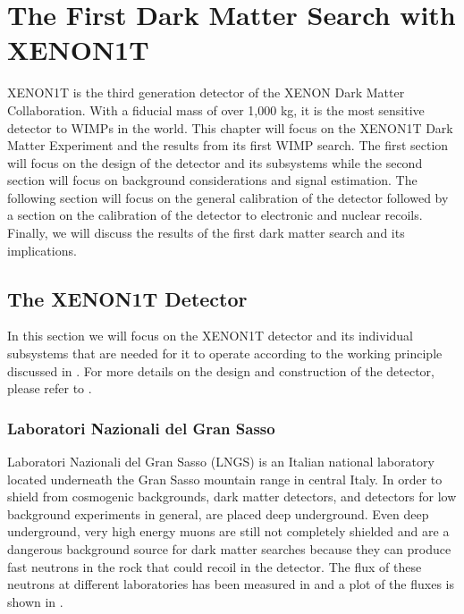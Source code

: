 

\pagestyle{cu}
\graphicspath{{./Chapter3/images/}}

\chapter[The First Dark Matter Search with XENON1T][The First Dark Matter Search with XENON1T]{The First Dark Matter Search with XENON1T}

XENON1T is the third generation detector of the XENON Dark Matter Collaboration.  With a fiducial mass of over 1,000 kg, it is the most sensitive detector to WIMPs in the world.  This chapter will focus on the XENON1T Dark Matter Experiment and the results from its first WIMP search.  The first section will focus on the design of the detector and its subsystems while the second section will focus on background considerations and signal estimation.  The following section will focus on the general calibration of the detector followed by a section on the calibration of the detector to electronic and nuclear recoils.  Finally, we will discuss the results of the first dark matter search and its implications.


\section{The XENON1T Detector}
\label{sec:xe1t_detector}

In this section we will focus on the XENON1T detector and its individual subsystems that are needed for it to operate according to the working principle discussed in .  For more details on the design and construction of the detector, please refer to .

\subsection{ Laboratori Nazionali del Gran Sasso}

 Laboratori Nazionali del Gran Sasso (LNGS)  is an Italian national laboratory located underneath the Gran Sasso mountain range in central Italy.  In order to shield from cosmogenic backgrounds, dark matter detectors, and detectors for low background experiments in general, are placed deep underground.  Even deep underground, very high energy muons are still not completely shielded and are a dangerous background source for dark matter searches because they can produce fast neutrons in the rock that could recoil in the detector.  The flux of these neutrons at different laboratories has been measured in  and a plot of the fluxes is shown in .
 
